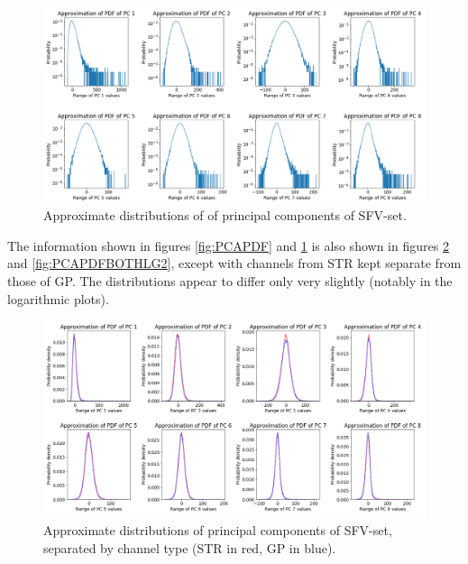 \documentclass{kththesis}
\begin{document}
\begin{figure}[H]
    \centering
    \centerline{\includegraphics[width=1.3\textwidth]{images/PCA/PCAPDFLG2.png}}
    \caption{Approximate distributions of of principal components of SFV-set.}
    \label{fig:PCAPDFLG2}
\end{figure}

The information shown in figures \ref{fig:PCAPDF} and \ref{fig:PCAPDFLG2} is also shown in figures \ref{fig:PCAPDFBOTH} and \ref{fig:PCAPDFBOTHLG2}, except with channels from STR kept separate from those of GP.
The distributions appear to differ only very slightly (notably in the logarithmic plots). 

\begin{figure}[H]
    \centering
    \centerline{\includegraphics[width=1.3\textwidth]{images/PCA/PCABOTH.png}}
    \caption{Approximate distributions of principal components of SFV-set, separated by channel type (STR in red, GP in blue).}
    \label{fig:PCAPDFBOTH}
\end{figure}
\end{document}
